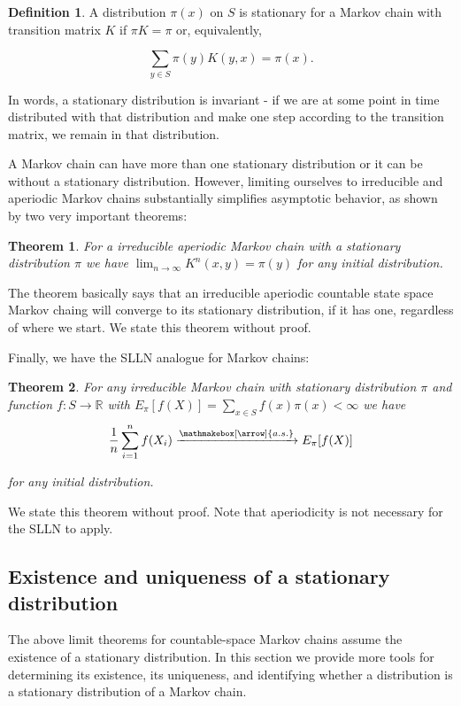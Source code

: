 \documentclass{book}
\theoremstyle{plain}%
\newtheorem{theorem}{Theorem}[section]
\theoremstyle{definition}
\newtheorem{definition}{Definition}[section]
\newlength{\arrow}
\newcommand*{\myrightarrow}[1]{\xrightarrow{\mathmakebox[\arrow]{#1}}}
\begin{document}
\begin{definition} A distribution $\pi(x)$ on $S$ is stationary for a Markov chain with transition matrix $K$ if $\pi K = \pi$ or, equivalently,

$$\sum_{y \in S} \pi(y)K(y,x) = \pi(x).$$
\end{definition}

In words, a stationary distribution is invariant - if we are at some point in time distributed with that distribution and make one step according to the transition matrix, we remain in that distribution.

A Markov chain can have more than one stationary distribution or it can be without a stationary distribution. However, limiting ourselves to irreducible and aperiodic Markov chains substantially simplifies asymptotic behavior, as shown by two very important theorems:

\begin{theorem}
For a irreducible aperiodic Markov chain with a stationary distribution $\pi$ we have $\lim_{n\rightarrow \infty} K^n(x,y) = \pi(y)$ for any initial distribution.
\end{theorem}

The theorem basically says that an irreducible aperiodic countable state space Markov chaing will converge to its stationary distribution, if it has one, regardless of where we start. We state this theorem without proof.

Finally, we have the SLLN analogue for Markov chains:

\begin{theorem} For any irreducible Markov chain with stationary distribution $\pi$ and function $f: S \rightarrow \mathbb{R}$ with $E_{\pi}[f(X)] = \sum_{x \in S} f(x) \pi(x) < \infty$ we have
$$ \frac{1}{n} \sum_{i=1}^n f(X_i) \myrightarrow{a.s.} E_{\pi}[f(X)]$$

for any initial distribution.
\end{theorem}

We state this theorem without proof. Note that aperiodicity is not necessary for the SLLN to apply.

\subsection*{Existence and uniqueness of a stationary distribution}

The above limit theorems for countable-space Markov chains assume the existence of a stationary distribution. In this section we provide more tools for determining its existence, its uniqueness, and identifying whether a distribution is a stationary distribution of a Markov chain.
\end{document}
